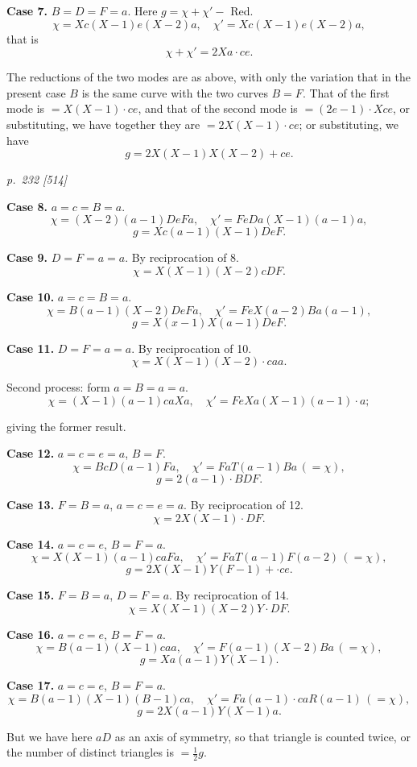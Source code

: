 \documentclass[11pt,a4paper]{article}
\theoremstyle{plain}
\theoremstyle{definition}
\begin{document}
\textbf{Case 7.}  $B=D=F=a$.  Here $g=\chi+\chi'-$ Red.
\[
\chi=Xc(X-1)e(X-2)a, \quad \chi'=Xc(X-1)e(X-2)a,
\]
that is
\[
\chi+\chi'=2Xa\cdot ce.
\]

The reductions of the two modes are as above, with only the variation that in the
present case $B$ is the same curve with the two curves $B=F$.  That of the first mode
is $=X(X-1)\cdot ce$, and that of the second mode is $=(2e-1)\cdot Xce$, or substituting, we have
together they are $=2X(X-1)\cdot ce$; or substituting, we have
\[
g=2X(X-1)X(X-2)+ce.
\]

\clearpage

\bigskip
\textit{p.~232 [514]}
\smallskip

\textbf{Case 8.}  $a=c=B=a$.
\[
\chi=(X-2)(a-1)DeFa, \quad \chi'=FeDa(X-1)(a-1)a,
\]
\[
g=Xc(a-1)(X-1)DeF.
\]

\textbf{Case 9.}  $D=F=a=a$.  By reciprocation of 8.
\[
\chi=X(X-1)(X-2)cDF.
\]

\textbf{Case 10.}  $a=c=B=a$.
\[
\chi=B(a-1)(X-2)DeFa, \quad \chi'=FeX(a-2)Ba(a-1),
\]
\[
g=X(x-1)X(a-1)DeF.
\]

\textbf{Case 11.}  $D=F=a=a$.  By reciprocation of 10.
\[
\chi=X(X-1)(X-2)\cdot caa.
\]

Second process: form $a=B=a=a$.
\[
\chi=(X-1)(a-1)caXa, \quad \chi'=FeXa(X-1)(a-1)\cdot a;
\]

giving the former result.

\textbf{Case 12.}  $a=c=e=a$, $B=F$.
\[
\chi=BcD(a-1)Fa, \quad \chi'=FaT(a-1)Ba\,(=\chi),
\]
\[
g=2(a-1)\cdot BDF.
\]

\textbf{Case 13.}  $F=B=a$, $a=c=e=a$.  By reciprocation of 12.
\[
\chi=2X(X-1)\cdot DF.
\]

\textbf{Case 14.}  $a=c=e$, $B=F=a$.
\[
\chi=X(X-1)(a-1)caFa, \quad \chi'=FaT(a-1)F(a-2)\,(=\chi),
\]
\[
g=2X(X-1)Y(F-1)+\cdot ce.
\]

\textbf{Case 15.}  $F=B=a$, $D=F=a$.  By reciprocation of 14.
\[
\chi=X(X-1)(X-2)Y\cdot DF.
\]

\textbf{Case 16.}  $a=c=e$, $B=F=a$.
\[
\chi=B(a-1)(X-1)caa, \quad \chi'=F(a-1)(X-2)Ba\,(=\chi),
\]
\[
g=Xa(a-1)Y(X-1).
\]

\textbf{Case 17.}  $a=c=e$, $B=F=a$.
\[
\chi=B(a-1)(X-1)(B-1)ca, \quad \chi'=Fa(a-1)\cdot caR(a-1)\,(=\chi),
\]
\[
g=2X(a-1)Y(X-1)a.
\]

But we have here $aD$ as an axis of symmetry, so that triangle is counted
twice, or the number of distinct triangles is $=\frac{1}{2}g$.

\clearpage
\end{document}

